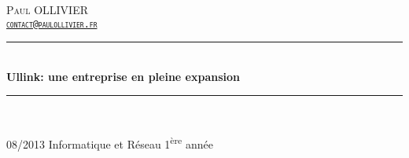 \newcommand{\HRule}{\rule{\linewidth}{0.5mm}}
\begin{titlepage}
\begin{center}


\hfill\textsc{\LARGE{Paul OLLIVIER}\\[0.4cm]
\hfill\href{mailto:contact@paulollivier.fr}{\texttt{contact@paulollivier.fr}}}

\vfill

\HRule \\[0.4cm]
{ \huge \bfseries Ullink: une entreprise en pleine expansion\\[0.4cm] }

\HRule \\[1.5cm]
\vfill

{\large 08/2013 \hfill Informatique et Réseau 1\textsuperscript{ère} année}

\end{center}
\end{titlepage}
